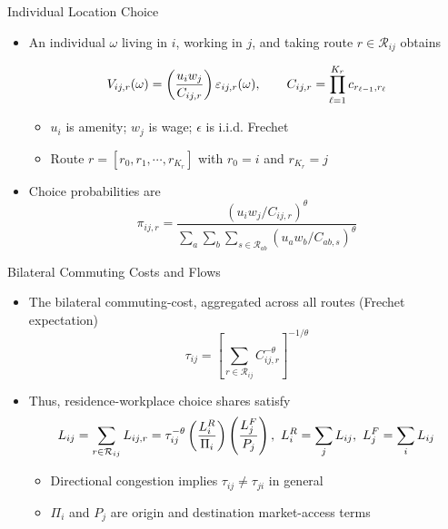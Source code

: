 \documentclass[11pt,aspectratio=169]{beamer}
\newcommand{\R}{\mathcal{R}}
\begin{document}
\begin{frame}{Individual Location Choice}
\begin{itemize}
  \item An individual $\omega$ living in $i$, working in $j$, and taking route $r\in\R_{ij}$ obtains
  \vspace{-0.5em}\begin{footnotesize}\begin{equation}
    V_{ij,r}(\omega) = \left( \frac{u_i w_j}{C_{ij,r}} \right)\varepsilon_{ij,r}(\omega),
    \qquad
    C_{ij,r} = \prod_{\ell=1}^{K_r} c_{r_{\ell-1},r_\ell}
  \vspace{-1.25em}\end{equation}\end{footnotesize}
  \begin{itemize}
    \item $u_i$ is amenity; $w_j$ is wage; $\epsilon$ is i.i.d. Frechet
    \item Route $r = [r_0, r_1, \cdots, r_{K_r}]$ with $r_0=i$ and $r_{K_r}=j$
  \end{itemize}
  \vspace{0.5em}
  \item Choice probabilities are
  \vspace{-0.5em}\begin{equation}\label{eq:pi}
    \pi_{ij,r} = \frac{\left(u_i w_j/C_{ij,r}\right)^\theta}{\sum_{a}\sum_b\sum_{s\in\R_{ab}}\left(u_a w_b/C_{ab,s}\right)^\theta}
  \end{equation}
\end{itemize}
\end{frame}

\begin{frame}{Bilateral Commuting Costs and Flows}
\begin{itemize}
  \item The bilateral commuting-cost, aggregated across all routes (Frechet expectation)
  \vspace{-0.5em}\begin{equation}
    \tau_{ij} = \left[ \sum_{r\in\R_{ij}} C_{ij,r}^{-\theta} \right]^{-1/\theta}
  \end{equation}
  \item Thus, residence-workplace choice shares satisfy
  \vspace{-0.25em}\begin{equation}\label{eq:gravity}
    L_{ij} = \sum_{r\in\R_{ij}}L_{ij,r} = \tau_{ij}^{-\theta} \left(\frac{L_i^R}{\Pi_i}\right) \left(\frac{L_j^F}{P_j}\right), \,\, L_i^R=\sum_jL_{ij}, \,\, L_j^F=\sum_iL_{ij}
  \vspace{-1em}\end{equation}
  \begin{itemize}
    \item Directional congestion implies $\tau_{ij}\neq\tau_{ji}$ in general
    \item $\Pi_i$ and $P_j$ are origin and destination market-access terms
  \end{itemize}
\end{itemize}
\end{frame}
\end{document}

